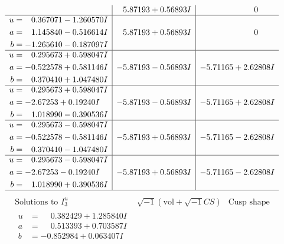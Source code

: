 \documentclass[1p]{elsarticle_modified}
\theoremstyle{definition}
\newcommand{\I}{\sqrt{-1}}
\begin{document}
$$\begin{array}{c|c|c}
 & \phantom{-}5.87193 + 0.56893 I & \phantom{-0.000000 } 0 \\ \hline\begin{aligned}
u &= \phantom{-}0.367071 - 1.260570 I \\
a &= \phantom{-}1.145840 - 0.516614 I \\
b &= -1.265610 - 0.187097 I\end{aligned}
 & \phantom{-}5.87193 + 0.56893 I & \phantom{-0.000000 } 0 \\ \hline\begin{aligned}
u &= \phantom{-}0.295673 + 0.598047 I \\
a &= -0.522578 + 0.581146 I \\
b &= \phantom{-}0.370410 + 1.047480 I\end{aligned}
 & -5.87193 - 0.56893 I & -5.71165 + 2.62808 I \\ \hline\begin{aligned}
u &= \phantom{-}0.295673 + 0.598047 I \\
a &= -2.67253 + 0.19240 I \\
b &= \phantom{-}1.018990 - 0.390536 I\end{aligned}
 & -5.87193 - 0.56893 I & -5.71165 + 2.62808 I \\ \hline\begin{aligned}
u &= \phantom{-}0.295673 - 0.598047 I \\
a &= -0.522578 - 0.581146 I \\
b &= \phantom{-}0.370410 - 1.047480 I\end{aligned}
 & -5.87193 + 0.56893 I & -5.71165 - 2.62808 I \\ \hline\begin{aligned}
u &= \phantom{-}0.295673 - 0.598047 I \\
a &= -2.67253 - 0.19240 I \\
b &= \phantom{-}1.018990 + 0.390536 I\end{aligned}
 & -5.87193 + 0.56893 I & -5.71165 - 2.62808 I\\
 \hline 
 \end{array}$$\newpage$$\begin{array}{c|c|c}  
\text{Solutions to }I^u_{3}& \I (\text{vol} + \sqrt{-1}CS) & \text{Cusp shape}\\
 \hline 
\begin{aligned}
u &= \phantom{-}0.382429 + 1.285840 I \\
a &= \phantom{-}0.513393 + 0.703587 I \\
b &= -0.852984 + 0.063407 I\end{aligned}

\end{array}$$
\end{document}
